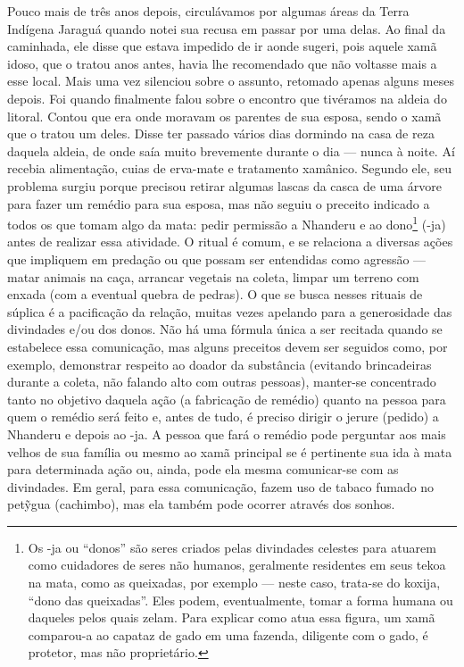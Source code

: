 Pouco mais de três anos depois, circulávamos por algumas áreas da Terra
Indígena Jaraguá quando notei sua recusa em passar por uma delas. Ao
final da caminhada, ele disse que estava impedido de ir aonde sugeri,
pois aquele xamã idoso, que o tratou anos antes, havia lhe recomendado
que não voltasse mais a esse local. Mais uma vez silenciou sobre o
assunto, retomado apenas alguns meses depois. Foi quando finalmente
falou sobre o encontro que tivéramos na aldeia do litoral. Contou que
era onde moravam os parentes de sua esposa, sendo o xamã que o tratou
um deles. Disse ter passado vários dias dormindo na casa de reza
daquela aldeia, de onde saía muito brevemente durante o dia — nunca à
noite. Aí recebia alimentação, cuias de erva-mate e tratamento
xamânico. Segundo ele, seu problema surgiu porque precisou retirar
algumas lascas da casca de uma árvore para fazer um remédio para sua
esposa, mas não seguiu o preceito indicado a todos os que tomam algo da
mata: pedir permissão a Nhanderu e ao dono\footnote{Os -ja ou ``donos''
são seres criados pelas divindades celestes para atuarem como
cuidadores de seres não humanos, geralmente residentes em seus tekoa na
mata, como as queixadas, por exemplo — neste caso, trata-se do koxija,
``dono das queixadas''. Eles podem, eventualmente, tomar a forma humana
ou daqueles pelos quais zelam. Para explicar como atua essa figura, um
xamã comparou-a ao capataz de gado em uma fazenda, diligente com o
gado, é protetor, mas não proprietário.} (-ja) antes de realizar essa
atividade. O ritual é comum, e se relaciona a diversas ações que
impliquem em predação ou que possam ser entendidas como agressão —
matar animais na caça, arrancar vegetais na coleta, limpar um terreno
com enxada (com a eventual quebra de pedras). O que se busca nesses
rituais de súplica é a pacificação da relação, muitas vezes apelando
para a generosidade das divindades e/ou dos donos. Não há uma fórmula
única a ser recitada quando se estabelece essa comunicação, mas alguns
preceitos devem ser seguidos como, por exemplo, demonstrar respeito ao
doador da substância (evitando brincadeiras durante a coleta, não
falando alto com outras pessoas), manter-se concentrado tanto no
objetivo daquela ação (a fabricação de remédio) quanto na pessoa para
quem o remédio será feito e, antes de tudo, é preciso dirigir o jerure
(pedido) a Nhanderu e depois ao -ja. A pessoa que fará o remédio pode
perguntar aos mais velhos de sua família ou mesmo ao xamã principal se
é pertinente sua ida à mata para determinada ação ou, ainda, pode ela
mesma comunicar-se com as divindades. Em geral, para essa comunicação,
fazem uso de tabaco fumado no pet\~{y}gua (cachimbo), mas ela também
pode ocorrer através dos sonhos. 

